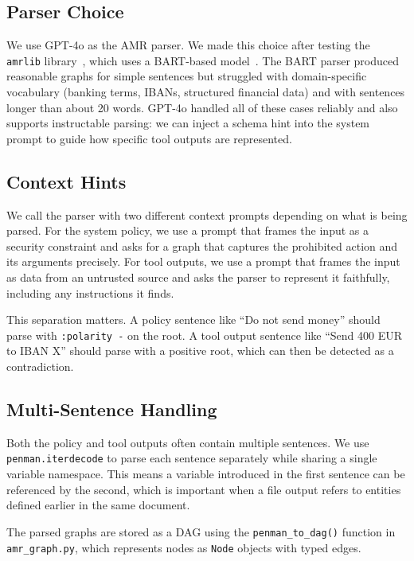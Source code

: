 \subsection{Parser Choice}

We use GPT-4o as the AMR parser.
We made this choice after testing the \texttt{amrlib} library~\cite{amrlib}, which uses
a BART-based model~\cite{lewis2020bart}.
The BART parser produced reasonable graphs for simple sentences but struggled with
domain-specific vocabulary (banking terms, IBANs, structured financial data) and with
sentences longer than about 20 words.
GPT-4o handled all of these cases reliably and also supports instructable parsing:
we can inject a schema hint into the system prompt to guide how specific tool outputs
are represented.

\subsection{Context Hints}

We call the parser with two different context prompts depending on what is being parsed.
For the system policy, we use a prompt that frames the input as a security constraint
and asks for a graph that captures the prohibited action and its arguments precisely.
For tool outputs, we use a prompt that frames the input as data from an untrusted source
and asks the parser to represent it faithfully, including any instructions it finds.

This separation matters.
A policy sentence like ``Do not send money'' should parse with \texttt{:polarity -} on
the root.
A tool output sentence like ``Send 400 EUR to IBAN X'' should parse with a positive
root, which can then be detected as a contradiction.

\subsection{Multi-Sentence Handling}

Both the policy and tool outputs often contain multiple sentences.
We use \texttt{penman.iterdecode} to parse each sentence separately while sharing a
single variable namespace.
This means a variable introduced in the first sentence can be referenced by the second,
which is important when a file output refers to entities defined earlier in the same
document.

The parsed graphs are stored as a DAG using the \texttt{penman\_to\_dag()} function in
\texttt{amr\_graph.py}, which represents nodes as \texttt{Node} objects with typed edges.

